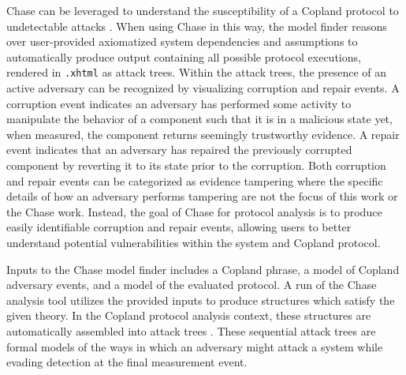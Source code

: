 \documentclass[runningheads]{llncs}
\theoremstyle{definition}
\begin{document}
Chase can be leveraged to understand the susceptibility of a Copland protocol to undetectable attacks \cite{Rowe:2021:AutomatedTrust}. When using Chase in this way, the model finder reasons over user-provided axiomatized system dependencies and assumptions to automatically produce output containing all possible protocol executions, rendered in \texttt{.xhtml} as attack trees. Within the attack trees, the presence of an active adversary can be recognized by visualizing corruption and repair events. A corruption event indicates an adversary has performed some activity to manipulate the behavior of a component such that it is in a malicious state yet, when measured, the component returns seemingly trustworthy evidence. A repair event indicates that an adversary has repaired the previously corrupted component by reverting it to its state prior to the corruption. Both corruption and repair events can be categorized as evidence tampering where the specific details of how an adversary performs tampering are not the focus of this work or the Chase work. Instead, the goal of Chase for protocol analysis is to produce easily identifiable corruption and repair events, allowing users to better understand potential vulnerabilities within the system and Copland protocol. 

Inputs to the Chase model finder includes a Copland phrase, a model of Copland adversary events, and a model of the evaluated protocol. A run of the Chase analysis tool utilizes the provided inputs to produce structures which satisfy the given theory. In the Copland protocol analysis context, these structures are automatically assembled into attack trees \cite{Rowe:2021:AutomatedTrust}.  
These sequential attack trees \cite{Horne:Attack, Jhaware:attack} are formal models of the ways in which an adversary might attack a system while evading detection at the final measurement event. 







\end{document}
